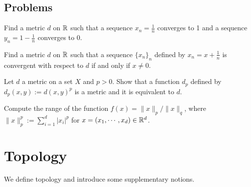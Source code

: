 \subsection*{Problems}

\begin{prb}
Find a metric $d$ on $\mathbb{R}$ such that a sequence $x_n=\frac1n$ converges to 1 and a sequence $y_n=1-\frac1n$ converges to 0.
\end{prb}
\begin{prb}
Find a metric $d$ on $\mathbb{R}$ such that a sequence $\{x_n\}_n$ defined by $x_n=x+\frac1n$ is convergent with respect to $d$ if and only if $x\ne0$.
\end{prb}
\begin{prb}
Let $d$ a metric on a set $X$ and $p>0$.
Show that a function $d_p$ defined by $d_p(x,y):=d(x,y)^p$ is a metric and it is equivalent to $d$.
\end{prb}
\begin{prb}
Compute the range of the function $f(x)=\|x\|_p/\|x\|_q$, where $\|x\|_p^p:=\sum_{i=1}^d|x_i|^p$ for $x=(x_1,\cdots,x_d)\in\mathbb{R}^d$.
\end{prb}
























\section{Topology}
We define topology and introduce some supplementary notions.




